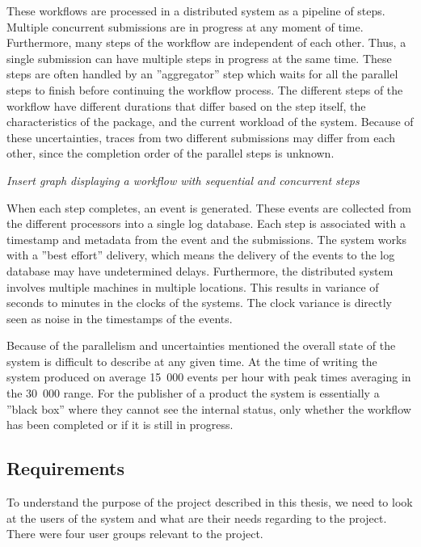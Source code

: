 \documentclass[english,12pt,a4paper,pdftex,sci,utf8]{aaltothesis}
\newcommand{\nyi}[1]{\colorbox{nyibg}{\textcolor{nyitext}{\emph{#1}}}}
\begin{document}
These workflows are processed in a distributed system as a pipeline of steps. 
Multiple concurrent submissions are in progress at any moment of time.
Furthermore, many steps of the workflow are independent of each other.
Thus, a single submission can have multiple steps in progress at the same time.
These steps are often handled by an ''aggregator'' step which waits for 
all the parallel steps to finish before continuing the workflow process.
The different steps of the workflow have different durations that differ based on
the step itself, the characteristics of the package, and the current workload of the system.
Because of these uncertainties, traces from two different submissions may differ from each other, 
since the completion order of the parallel steps is unknown.

\nyi{Insert graph displaying a workflow with sequential and concurrent steps}

When each step completes, an event is generated.
These events are collected from the different processors into a single log database.
Each step is associated with a timestamp and metadata from the event and the submissions.
The system works with a ''best effort'' delivery, which means the delivery of the events to the log database
may have undetermined delays. Furthermore, the distributed system involves multiple machines
in multiple locations. This results in variance of seconds to minutes in the clocks of the systems.
The clock variance is directly seen as noise in the timestamps of the events.

Because of the parallelism and uncertainties mentioned the overall state of the system is difficult to describe at any given time. At the time of writing the system produced on average 15~000 events per hour with peak times averaging in the 30~000 range. For the publisher of a product the system is essentially a ''black box'' where
they cannot see the internal status, only whether the workflow has been completed or if it is still in progress.

\subsection{Requirements}

To understand the purpose of the project described in this thesis, we need to look at the users of the system
and what are their needs regarding to the project. There were four user groups relevant to the project.
\end{document}
